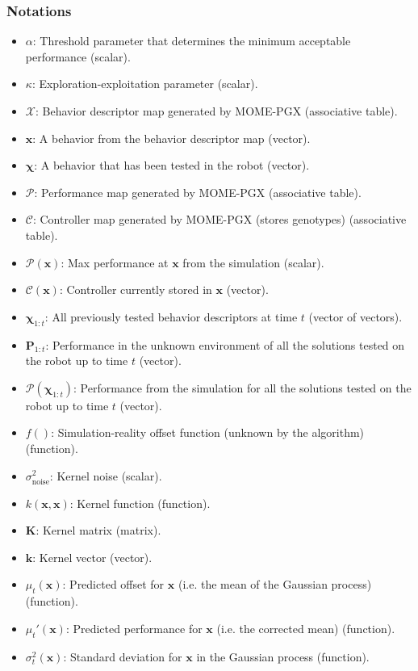 \documentclass[12pt]{article}
\begin{document}
\subsubsection{Notations}\label{notations}
\begin{itemize}[label={$\bullet$}]
    \item $\alpha$: Threshold parameter that determines the minimum acceptable performance (scalar).
    \item $\kappa$: Exploration-exploitation parameter (scalar).
    \item $\mathcal{X}$: Behavior descriptor map generated by MOME-PGX (associative table).
    \item $\mathbf{x}$: A behavior from the behavior descriptor map (vector).
    \item $\boldsymbol{\chi}$: A behavior that has been tested in the robot (vector).
    \item $\mathcal{P}$: Performance map generated by MOME-PGX (associative table).
    \item $\mathcal{C}$: Controller map generated by MOME-PGX (stores genotypes) (associative table).
    \item $\mathcal{P}(\mathbf{x})$: Max performance at $\mathbf{x}$ from the simulation (scalar).
    \item $\mathcal{C}(\mathbf{x})$: Controller currently stored in $\mathbf{x}$ (vector).
    \item $\boldsymbol{\chi}_{1:t}$: All previously tested behavior descriptors at time $t$ (vector of vectors).
    \item $\mathbf{P}_{1:t}$: Performance in the unknown environment of all the solutions tested on the robot up to time $t$ (vector).
    \item $\mathcal{P}(\boldsymbol{\chi}_{1:t})$: Performance from the simulation for all the solutions tested on the robot up to time $t$ (vector).
    \item $f()$: Simulation-reality offset function (unknown by the algorithm) (function).
    \item $\sigma_{\text{noise}}^2$: Kernel noise (scalar).
    \item $k(\mathbf{x}, \mathbf{x})$: Kernel function (function).
    \item $\mathbf{K}$: Kernel matrix (matrix).
    \item $\mathbf{k}$: Kernel vector (vector).
    \item $\mu_t(\mathbf{x})$: Predicted offset for $\mathbf{x}$ (i.e. the mean of the Gaussian process) (function).
    \item $\mu_t'(\mathbf{x})$: Predicted performance for $\mathbf{x}$ (i.e. the corrected mean) (function).
    \item $\sigma_t^2(\mathbf{x})$: Standard deviation for $\mathbf{x}$ in the Gaussian process (function).
\end{itemize}
\end{document}
